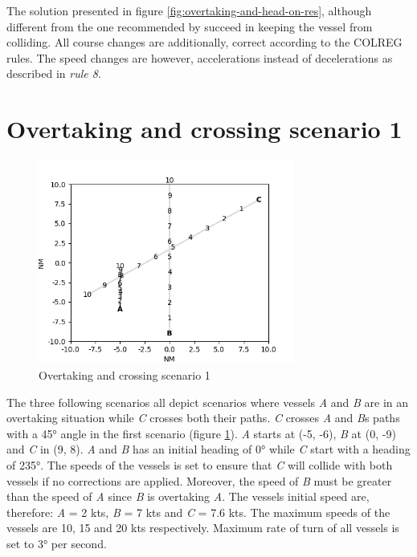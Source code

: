 The solution presented in figure \ref{fig:overtaking-and-head-on-res}, although different from the one recommended by \textcite{ecolreg_overtaking-and-head-on} succeed in keeping the vessel from colliding. All course changes are additionally, correct according to the COLREG rules. The speed changes are however, accelerations instead of decelerations as described in  \textit{rule 8}.


\section{Overtaking and crossing scenario 1}%


\label{sec:overtaking-and-crossing}
\begin{figure}[H]
    \centering
    \includegraphics[width=0.75\textwidth,height=0.75\textheight,keepaspectratio]{../src/img/overtaking_crossing.png}
    \caption[Overtaking and crossing scenario 1]{Overtaking and crossing scenario 1 \cite{ecolreg_overtaking-and-crossing}}
    \label{fig:overtaking-and-crossing}
\end{figure}
The three following scenarios all depict scenarios where vessels \textit{A} and \textit{B} are in an overtaking situation while \textit{C} crosses both their paths. \textit{C} crosses \textit{A} and \textit{B}s paths with a \ang{45}  angle in the first scenario (figure \ref{fig:overtaking-and-crossing}). \textit{A} starts at (-5, -6), \textit{B} at (0, -9) and \textit{C} in (9, 8). \textit{A} and \textit{B} has an initial heading of \ang{0}  while \textit{C} start with a heading of \ang{235}. The speeds of the vessels is set to ensure that \textit{C} will collide with both vessels if no corrections are applied. Moreover, the speed of \textit{B} must be greater than the speed of \textit{A} since \textit{B} is overtaking \textit{A}. The vessels initial speed are, therefore: \textit{A} = 2 kts, \textit{B} = 7 kts and \textit{C} = 7.6 kts. The maximum speeds of the vessels are 10, 15 and 20 kts respectively. Maximum rate of turn of all vessels is set to \ang{3} per second.

